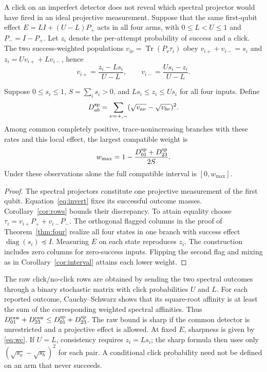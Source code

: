 \documentclass[11pt,letterpaper]{article}
\newcommand{\tr}{\operatorname{Tr}}\newcommand{\TV}{\operatorname{TV}}\newcommand{\E}{\mathbb E}\newcommand{\id}{\mathbb I}\newcommand{\calB}{\mathcal B}\newcommand{\norm}[1]{\left\lVert#1\right\rVert}
\begin{document}
A click on an imperfect detector does not reveal which spectral projector would have fired in an ideal projective measurement. Suppose that the same first-qubit effect $E=L I+(U-L)P_+$ acts in all four arms, with $0\le L<U\le1$ and $P_-=I-P_+$. Let $z_i$ denote the per-attempt probability of success and a click. The two success-weighted populations $v_{i\nu}=\tr(P_\nu\tau_i)$ obey $v_{i+}+v_{i-}=s_i$ and $z_i=Uv_{i+}+Lv_{i-}$, hence
\begin{equation}
 v_{i+}=\frac{z_i-Ls_i}{U-L},\qquad
 v_{i-}=\frac{Us_i-z_i}{U-L}.\label{eq:invert}
\end{equation}
\begin{corollary}\label{cor:calibrated}
Suppose $0\le s_i\le1$, $S=\sum_i s_i>0$, and $Ls_i\le z_i\le Us_i$ for all four inputs. Define
\[
 D^{\rm sp}_{ab}=\sum_{\nu=+,-}(\sqrt{v_{a\nu}}-\sqrt{v_{b\nu}})^2.
\]
Among common completely positive, trace-nonincreasing branches with these rates and this local effect, the largest compatible weight is
\begin{equation}
 w_{\max}=1-\frac{D^{\rm sp}_{01}+D^{\rm sp}_{23}}{2S}.\label{eq:wc}
\end{equation}
Under these observations alone the full compatible interval is $[0,w_{\max}]$.
\end{corollary}
\begin{proof}
The spectral projectors constitute one projective measurement of the first qubit. Equation~\eqref{eq:invert} fixes its successful outcome masses. Corollary~\ref{cor:rows} bounds their discrepancy. To attain equality choose $\tau_i=v_{i+}P_++v_{i-}P_-$. The orthogonal flagged columns in the proof of Theorem~\ref{thm:four} realize all four states in one branch with success effect $\operatorname{diag}(s_i)\preceq I$. Measuring $E$ on each state reproduces $z_i$. The construction includes zero columns for zero-success inputs. Flipping the second flag and mixing as in Corollary~\ref{cor:interval} attains each lower weight.
\end{proof}
The raw click/no-click rows are obtained by sending the two spectral outcomes through a binary stochastic matrix with click probabilities $U$ and $L$. For each reported outcome, Cauchy--Schwarz shows that its square-root affinity is at least the sum of the corresponding weighted spectral affinities. Thus $D^{\rm raw}_{01}+D^{\rm raw}_{23}\le D^{\rm sp}_{01}+D^{\rm sp}_{23}$. The raw bound is sharp if the common detector is unrestricted and a projective effect is allowed. At fixed $E$, sharpness is given by \eqref{eq:wc}. If $U=L$, consistency requires $z_i=Ls_i$; the sharp formula then uses only $(\sqrt{s_a}-\sqrt{s_b})^2$ for each pair. A conditional click probability need not be defined on an arm that never succeeds.
\end{document}
